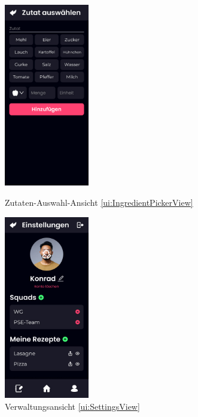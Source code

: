 \documentclass[parskip=full]{scrartcl}
\begin{document}
\begin{figure}[htp]
    \begin{minipage}
        [t]{0.49\textwidth}
        \centering
        \includegraphics[height=80mm]{images/ui/IngredientPickerView.jpg}
        \caption{Zutaten-Auswahl-Ansicht \ref{ui:IngredientPickerView}}
        \label{fig:IngredientPickerView}
    \end{minipage}
    \begin{minipage}
        [t]{0.49\textwidth}
        \centering
        \includegraphics[height=80mm]{images/ui/SettingsView.jpg}
        \caption{Verwaltungsansicht \ref{ui:SettingsView}}
        \label{fig:SettingsView}
    \end{minipage}
\end{figure}
\end{document}
